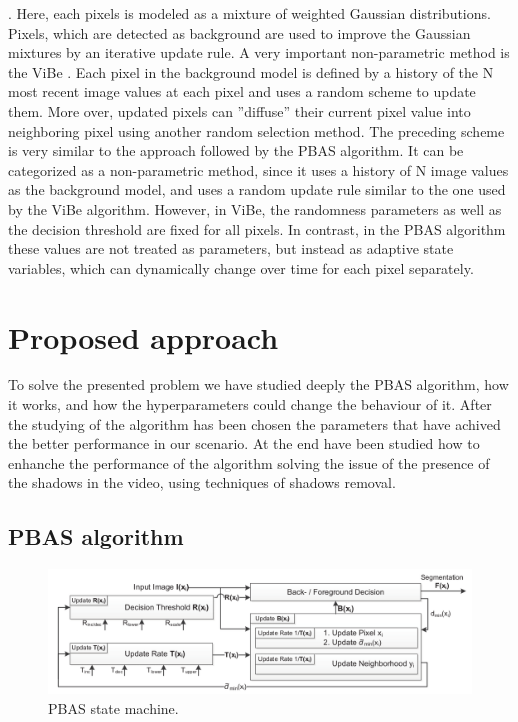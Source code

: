 \cite{gmm}. Here, each pixels is modeled as a mixture of weighted Gaussian distributions. Pixels, which
are detected as background are used to improve the Gaussian mixtures by an iterative update rule. A very
important non-parametric method is the ViBe \cite{vibe}. Each pixel in the background model is defined by
a history of the N most recent image values at each pixel and uses a random scheme to update them.
More over, updated pixels can ”diffuse” their current pixel value into neighboring pixel using another
random selection method. The preceding scheme is very similar to the approach followed by the PBAS algorithm.
It can be categorized as a non-parametric method, since it uses a history of N image values as the background
model, and uses a random update rule similar to the one used by the ViBe algorithm. However, in ViBe, the
randomness parameters as well as the decision threshold are fixed for all pixels. In contrast, in the PBAS
algorithm these values are not treated as parameters, but instead as adaptive state variables, which can
dynamically change over time for each pixel separately.


\section*{Proposed approach}
To solve the presented problem we have studied deeply the PBAS algorithm, how it works, and how the hyperparameters could change the behaviour of it. After the studying of the algorithm has been chosen the parameters that have achived the better performance in our scenario. At the end have been studied how to enhanche the performance of the algorithm solving the issue of the presence of the shadows in the video, using techniques of shadows removal.
\subsection{PBAS algorithm} \label{subsect:PBAS}

\begin{figure}
  \includegraphics[width=\textwidth]{Figures/PBAS_state_machine.png}
  \caption{PBAS state machine.}
\end{figure}

